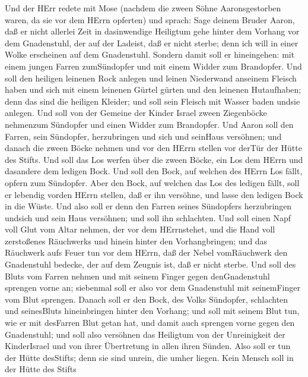  Und der HErr redete mit Mose (nachdem die zween Söhne
Aaronsgestorben waren, da sie vor dem HErrn opferten)  und
sprach: Sage deinem Bruder Aaron, daß er nicht allerlei Zeit in
dasinwendige Heiligtum gehe hinter dem Vorhang vor dem Gnadenstuhl, der
auf der Ladeist, daß er nicht sterbe; denn ich will in einer Wolke
erscheinen auf dem Gnadenstuhl.  Sondern damit soll er
hineingehen: mit einem jungen Farren zumSündopfer und mit einem Widder
zum Brandopfer.  Und soll den heiligen leinenen Rock anlegen
und leinen Niederwand anseinem Fleisch haben und sich mit einem leinenen
Gürtel gürten und den leinenen Hutaufhaben; denn das sind die heiligen
Kleider; und soll sein Fleisch mit Wasser baden undsie anlegen.
 Und soll von der Gemeine der Kinder Israel zween
Ziegenböcke nehmenzum Sündopfer und einen Widder zum Brandopfer.
 Und Aaron soll den Farren, sein Sündopfer, herzubringen und
sich und seinHaus versöhnen;  und danach die zween Böcke
nehmen und vor den HErrn stellen vor derTür der Hütte des Stifts.
 Und soll das Los werfen über die zween Böcke, ein Los dem
HErrn und dasandere dem ledigen Bock.  Und soll den Bock,
auf welchen des HErrn Los fällt, opfern zum Sündopfer. 
Aber den Bock, auf welchen das Los des ledigen fällt, soll er lebendig
vorden HErrn stellen, daß er ihn versöhne, und lasse den ledigen Bock in
die Wüste.  Und also soll er denn den Farren seines
Sündopfers herzubringen undsich und sein Haus versöhnen; und soll ihn
schlachten.  Und soll einen Napf voll Glut vom Altar
nehmen, der vor dem HErrnstehet, und die Hand voll zerstoßenes
Räuchwerks und hinein hinter den Vorhangbringen;  und das
Räuchwerk aufs Feuer tun vor dem HErrn, daß der Nebel vomRäuchwerk den
Gnadenstuhl bedecke, der auf dem Zeugnis ist, daß er nicht sterbe.
 Und soll des Bluts vom Farren nehmen und mit seinem Finger
gegen denGnadenstuhl sprengen vorne an; siebenmal soll er also vor dem
Gnadenstuhl mit seinemFinger vom Blut sprengen.  Danach
soll er den Bock, des Volks Sündopfer, schlachten und seinesBluts
hineinbringen hinter den Vorhang; und soll mit seinem Blut tun, wie er
mit desFarren Blut getan hat, und damit auch sprengen vorne gegen den
Gnadenstuhl;  und soll also versöhnen das Heiligtum von der
Unreinigkeit der KinderIsrael und von ihrer Übertretung in allen ihren
Sünden. Also soll er tun der Hütte desStifts; denn sie sind unrein, die
umher liegen.  Kein Mensch soll in der Hütte des Stifts
